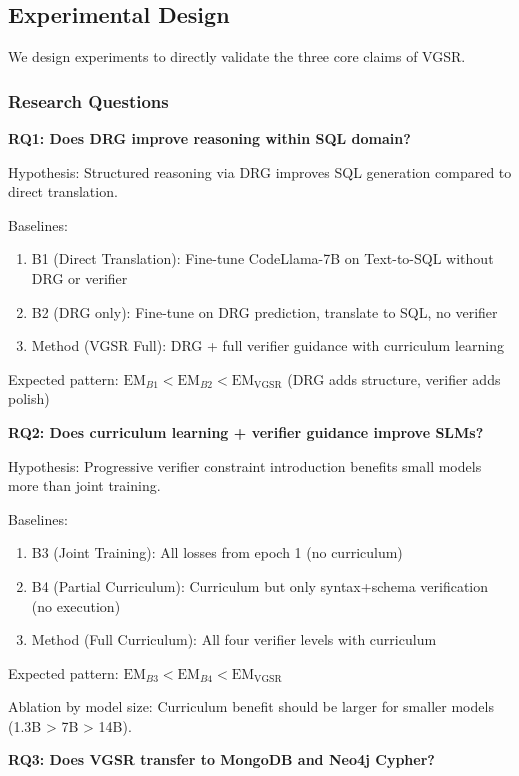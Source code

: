 \documentclass[conference]{IEEEtran}
\begin{document}
\subsection{Experimental Design}

We design experiments to directly validate the three core claims of VGSR.

\subsubsection{Research Questions}

\textbf{RQ1: Does DRG improve reasoning within SQL domain?}

Hypothesis: Structured reasoning via DRG improves SQL generation compared to direct translation.

Baselines:
\begin{enumerate}
\item B1 (Direct Translation): Fine-tune CodeLlama-7B on Text-to-SQL without DRG or verifier
\item B2 (DRG only): Fine-tune on DRG prediction, translate to SQL, no verifier
\item Method (VGSR Full): DRG + full verifier guidance with curriculum learning
\end{enumerate}

Expected pattern: $\text{EM}_{B1} < \text{EM}_{B2} < \text{EM}_{\text{VGSR}}$ (DRG adds structure, verifier adds polish)

\textbf{RQ2: Does curriculum learning + verifier guidance improve SLMs?}

Hypothesis: Progressive verifier constraint introduction benefits small models more than joint training.

Baselines:
\begin{enumerate}
\item B3 (Joint Training): All losses from epoch 1 (no curriculum)
\item B4 (Partial Curriculum): Curriculum but only syntax+schema verification (no execution)
\item Method (Full Curriculum): All four verifier levels with curriculum
\end{enumerate}

Expected pattern: $\text{EM}_{B3} < \text{EM}_{B4} < \text{EM}_{\text{VGSR}}$

Ablation by model size: Curriculum benefit should be larger for smaller models (1.3B > 7B > 14B).

\textbf{RQ3: Does VGSR transfer to MongoDB and Neo4j Cypher?}
\end{document}
